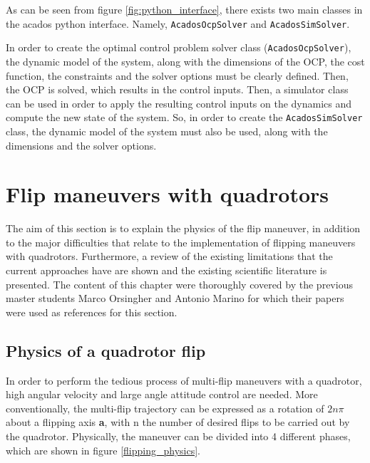 \documentclass{thesisreport}
\begin{document}
 As can be seen from figure \ref{fig:python_interface}, there exists two main classes in the acados python interface. Namely, \texttt{AcadosOcpSolver} and \texttt{AcadosSimSolver}. 
 
 In order to create the optimal control problem solver class (\texttt{AcadosOcpSolver}), the dynamic model of the system, along with the dimensions of the OCP, the cost function, the constraints and the solver options must be clearly defined. Then, the OCP is solved, which results in the control inputs.
 Then, a simulator class can be used in order to apply the resulting control inputs on the dynamics and compute the new state of the system. So, in order to create the \texttt{AcadosSimSolver} class, the dynamic model of the system must also be used, along with the dimensions and the solver options.
 
 
 
 
 
 
 
\newpage

\section{Flip maneuvers with quadrotors}


The aim of this section is to explain the physics of the flip maneuver, in addition to the major difficulties that relate to the implementation of flipping maneuvers with quadrotors. Furthermore, a review of the existing limitations that the current approaches have are shown and the existing scientific literature is presented. The content of this chapter were thoroughly covered by the previous master students Marco Orsingher \cite{Orsingher2019} and Antonio Marino \cite{Marino2020} for which their papers were used as references for this section.  

\subsection{Physics of a quadrotor flip}\label{multiflip_physics}


In order to perform the tedious process of multi-flip maneuvers with a quadrotor, high angular velocity and large angle attitude control are needed. More conventionally, the multi-flip trajectory can be expressed as a rotation of $2n \pi$ about a flipping axis \textbf{a}, with n the number of desired flips to be carried out by the quadrotor. Physically, the maneuver can be divided into 4 different phases, which are shown in figure \ref{flipping_physics}.
\end{document}
